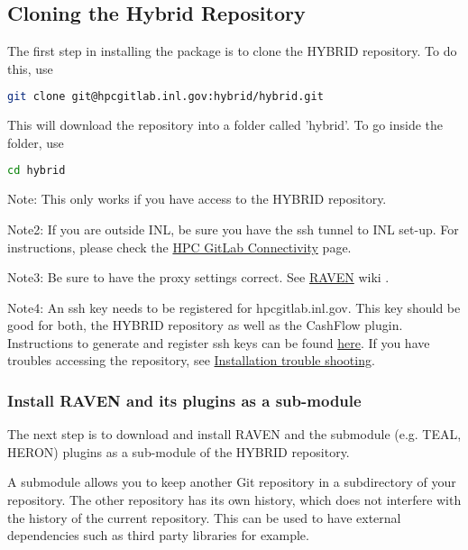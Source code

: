 \subsection{Cloning the Hybrid Repository}
\label{sec:clone raven}

The first step in installing the package is to clone the HYBRID repository. To do this, use
\begin{lstlisting}[language=bash]
git clone git@hpcgitlab.inl.gov:hybrid/hybrid.git
\end{lstlisting}
This will download the repository into a folder called 'hybrid'. To go inside the folder, use
\begin{lstlisting}[language=bash]
cd hybrid
\end{lstlisting}

\begin{list}{}{}
\item Note: This only works if you have access to the HYBRID repository.

\item Note2: If you are outside INL, be sure you have the ssh tunnel to INL set-up. For instructions, please check the \href{http://mooseframework.org/wiki/hpcgitlabconnectivity/}{HPC GitLab Connectivity} page.

\item Note3: Be sure to have the proxy settings correct. See \href{https://github.com/idaholab/raven/wiki}{RAVEN} wiki .

\item Note4: An ssh key needs to be registered for hpcgitlab.inl.gov. This key should be good for both, the HYBRID repository as well as the CashFlow plugin. Instructions to generate and register ssh keys can be found \href{https://hpcgitlab.inl.gov/help/ssh/README}{here}.
If you have troubles accessing the repository, see \href{/hybrid/hybrid/wikis/Install_troubles}{Installation trouble shooting}.
\end{list}

\subsubsection{Install RAVEN and its plugins as a sub-module}

The next step is to download and install RAVEN and the submodule (e.g. TEAL, HERON) plugins as a sub-module of the HYBRID repository. 

A submodule allows you to keep another Git repository in a subdirectory of your repository. The other repository has its own history, which does not interfere with the history of the current repository. This can be used to have external dependencies such as third party libraries for example.

